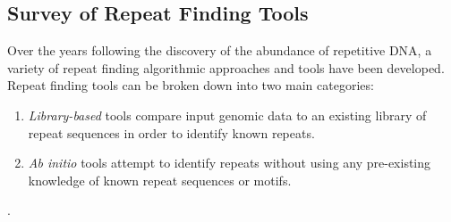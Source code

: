 \subsection{Survey of Repeat Finding Tools}
Over the years following the discovery of the abundance of repetitive DNA, a variety of repeat finding algorithmic approaches and tools have been developed. Repeat finding tools can be broken down into two main categories:
\begin{enumerate}
\item{\textit{Library-based} tools compare input genomic data to an existing library of repeat sequences in order to identify known repeats.}
\item{\textit{Ab initio} tools attempt to identify repeats without using any pre-existing knowledge of known repeat sequences or motifs.}
\end{enumerate}

 \cite{saha2008computational}. 